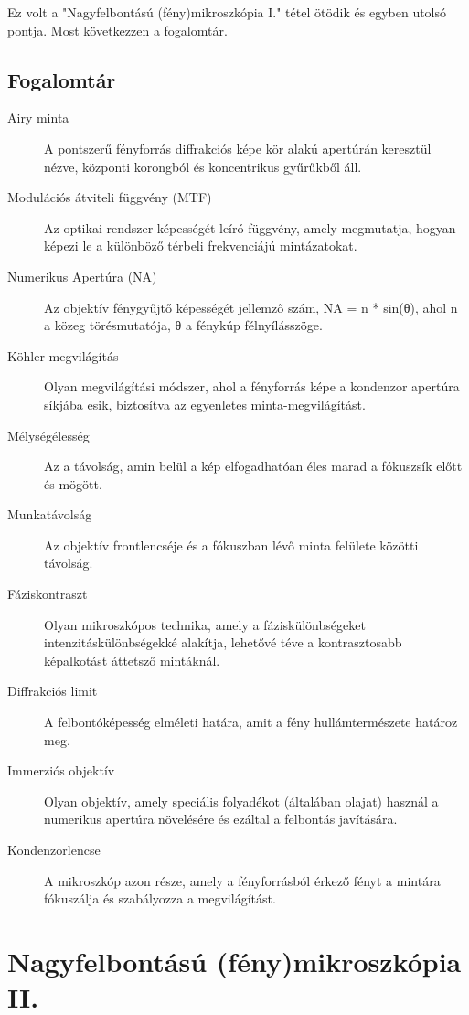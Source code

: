 \documentclass[a4paper,12pt]{article}
\begin{document}
Ez volt a "Nagyfelbontású (fény)mikroszkópia I." tétel ötödik és egyben utolsó pontja. Most következzen a fogalomtár.

\subsection{Fogalomtár} 

\begin{description} \item[Airy minta] A pontszerű fényforrás diffrakciós képe kör alakú apertúrán keresztül nézve, központi korongból és koncentrikus gyűrűkből áll.

\item[Modulációs átviteli függvény (MTF)] Az optikai rendszer képességét leíró függvény, amely megmutatja, hogyan képezi le a különböző térbeli frekvenciájú mintázatokat. \item[Numerikus Apertúra (NA)] Az objektív fénygyűjtő képességét jellemző szám, NA = n * sin(θ), ahol n a közeg törésmutatója, θ a fénykúp félnyílásszöge. \item[Köhler-megvilágítás] Olyan megvilágítási módszer, ahol a fényforrás képe a kondenzor apertúra síkjába esik, biztosítva az egyenletes minta-megvilágítást. \item[Mélységélesség] Az a távolság, amin belül a kép elfogadhatóan éles marad a fókuszsík előtt és mögött. \item[Munkatávolság] Az objektív frontlencséje és a fókuszban lévő minta felülete közötti távolság. \item[Fáziskontraszt] Olyan mikroszkópos technika, amely a fáziskülönbségeket intenzitáskülönbségekké alakítja, lehetővé téve a kontrasztosabb képalkotást áttetsző mintáknál. \item[Diffrakciós limit] A felbontóképesség elméleti határa, amit a fény hullámtermészete határoz meg. \item[Immerziós objektív] Olyan objektív, amely speciális folyadékot (általában olajat) használ a numerikus apertúra növelésére és ezáltal a felbontás javítására. \item[Kondenzorlencse] A mikroszkóp azon része, amely a fényforrásból érkező fényt a mintára fókuszálja és szabályozza a megvilágítást.
\end{description}

\newpage

\section{Nagyfelbontású (fény)mikroszkópia II.}
\end{document}
